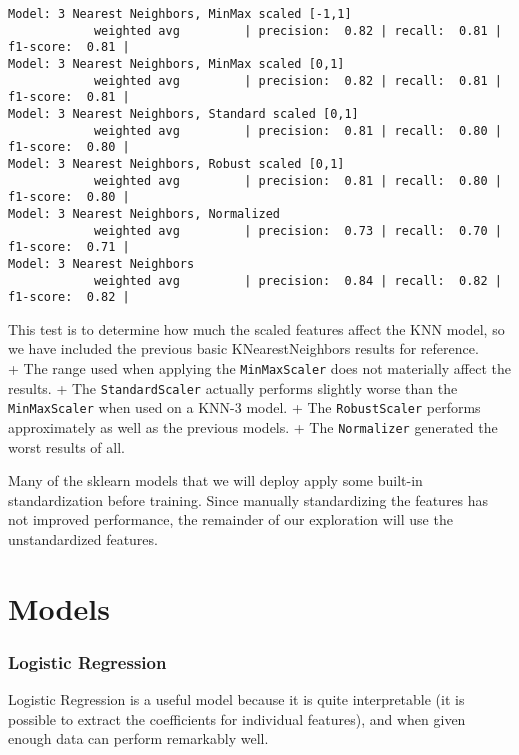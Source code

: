\documentclass[11pt]{article}
\begin{document}
    \begin{Verbatim}[commandchars=\\\{\}]
Model: 3 Nearest Neighbors, MinMax scaled [-1,1]
			weighted avg         | precision:  0.82 | recall:  0.81 | f1-score:  0.81 | 
Model: 3 Nearest Neighbors, MinMax scaled [0,1]
			weighted avg         | precision:  0.82 | recall:  0.81 | f1-score:  0.81 | 
Model: 3 Nearest Neighbors, Standard scaled [0,1]
			weighted avg         | precision:  0.81 | recall:  0.80 | f1-score:  0.80 | 
Model: 3 Nearest Neighbors, Robust scaled [0,1]
			weighted avg         | precision:  0.81 | recall:  0.80 | f1-score:  0.80 | 
Model: 3 Nearest Neighbors, Normalized
			weighted avg         | precision:  0.73 | recall:  0.70 | f1-score:  0.71 | 
Model: 3 Nearest Neighbors
			weighted avg         | precision:  0.84 | recall:  0.82 | f1-score:  0.82 | 

    \end{Verbatim}

    This test is to determine how much the scaled features affect the KNN
model, so we have included the previous basic KNearestNeighbors results
for reference.\\
+ The range used when applying the \texttt{MinMaxScaler} does not
materially affect the results. + The \texttt{StandardScaler} actually
performs slightly worse than the \texttt{MinMaxScaler} when used on a
KNN-3 model. + The \texttt{RobustScaler} performs approximately as well
as the previous models. + The \texttt{Normalizer} generated the worst
results of all.

Many of the sklearn models that we will deploy apply some built-in
standardization before training. Since manually standardizing the
features has not improved performance, the remainder of our exploration
will use the unstandardized features.

    \section{Models}\label{models}

    \subsubsection{Logistic Regression}\label{logistic-regression}

    Logistic Regression is a useful model because it is quite interpretable
(it is possible to extract the coefficients for individual features),
and when given enough data can perform remarkably well.
\end{document}
